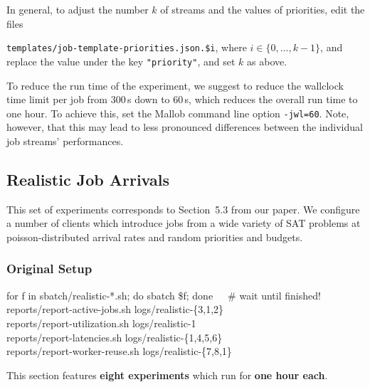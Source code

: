 \documentclass[runningheads]{article}
\numberwithin{dummy}{subsection}
\begin{document}
In general, to adjust the number $k$ of streams and the values of priorities, edit the files 

\texttt{templates/job-template-priorities.json.\$i}, where $i \in \{0,\ldots,k-1\}$, and replace the value under the key \texttt{"priority"}, and set $k$ as above. 

To reduce the run time of the experiment, we suggest to reduce the wallclock time limit per job from 300\,s down to 60\,s, which reduces the overall run time to one hour.
To achieve this, set the Mallob command line option \texttt{-jwl=60}.
Note, however, that this may lead to less pronounced differences between the individual job streams' performances.











\subsection{Realistic Job Arrivals}

This set of experiments corresponds to Section~5.3 from our paper.
We configure a number of clients which introduce jobs from a wide variety of SAT problems at poisson-distributed arrival rates and random priorities and budgets.

\subsubsection{Original Setup}

\begin{tcolorbox}[
  colback=Magenta!5!white,
  colframe=Magenta!75!black,
  title={\centering In a Nutshell: Commands for Original Setup}]
\begin{ttfenvcompact}
for f in sbatch/realistic-*.sh; do sbatch \$f; done\ \ \ \# wait until finished!\\
reports/report-active-jobs.sh logs/realistic-\{3,1,2\}\\
reports/report-utilization.sh logs/realistic-1\\
reports/report-latencies.sh logs/realistic-\{1,4,5,6\}\\
reports/report-worker-reuse.sh logs/realistic-\{7,8,1\}
\end{ttfenvcompact}
\end{tcolorbox}

This section features \textbf{eight experiments} which run for \textbf{one hour each}.
\end{document}
